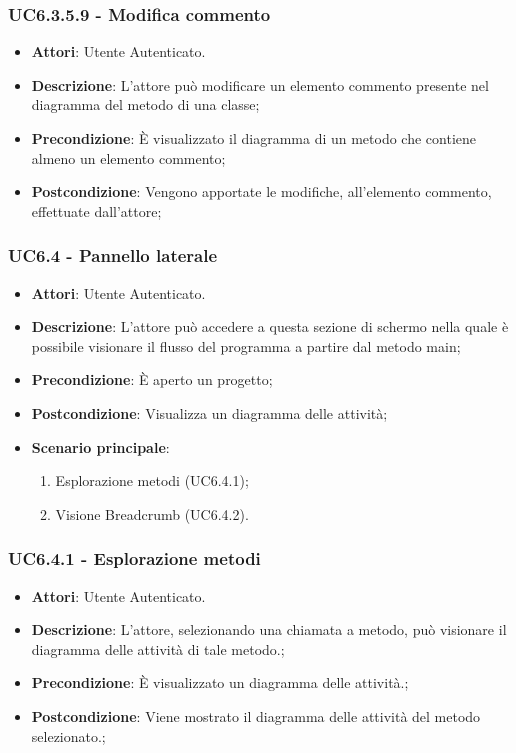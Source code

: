\subsubsection{UC6.3.5.9 - Modifica commento} 
\label{sssec:UC6.3.5.9} 
\begin{itemize} 
\item \textbf{Attori}: Utente Autenticato.
\item \textbf{Descrizione}: L'attore può modificare un elemento commento presente nel diagramma del metodo di una classe;
\item \textbf{Precondizione}: È visualizzato il diagramma di un metodo che contiene almeno un elemento commento;
\item \textbf{Postcondizione}: Vengono apportate le modifiche, all'elemento commento, effettuate dall'attore;
\end{itemize} 
\subsubsection{UC6.4 - Pannello laterale} 
\label{sssec:UC6.4} 
\begin{itemize} 
\item \textbf{Attori}: Utente Autenticato.
\item \textbf{Descrizione}: L'attore può accedere a questa sezione di schermo nella quale è possibile visionare il flusso del programma a partire dal metodo main;
\item \textbf{Precondizione}: È aperto un progetto;
\item \textbf{Postcondizione}: Visualizza un diagramma delle attività;
\item \textbf{Scenario principale}: \begin{enumerate}\item Esplorazione metodi (UC6.4.1);\item Visione Breadcrumb (UC6.4.2). 
 \end{enumerate}
\end{itemize} 
\subsubsection{UC6.4.1 - Esplorazione metodi} 
\label{sssec:UC6.4.1} 
\begin{itemize} 
\item \textbf{Attori}: Utente Autenticato.
\item \textbf{Descrizione}: L'attore, selezionando una chiamata a metodo, può visionare il diagramma delle attività di tale metodo.;
\item \textbf{Precondizione}: È visualizzato un diagramma delle attività.;
\item \textbf{Postcondizione}: Viene mostrato il diagramma delle attività del metodo selezionato.;
\end{itemize} 
